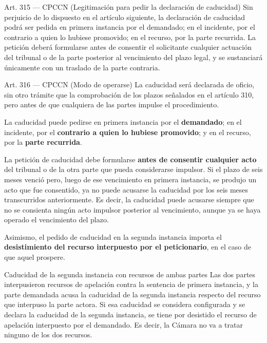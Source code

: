 \documentclass[12pt,oneside]{book}
\begin{document}
\begin{articulo}{Art. 315 --- CPCCN (Legitimación para pedir la declaración de caducidad)}
Sin perjuicio de lo dispuesto en el artículo siguiente, la declaración de caducidad podrá ser pedida en primera instancia por el demandado; en el incidente, por el contrario a quien lo hubiese promovido; en el recurso, por la parte recurrida. La petición deberá formularse antes de consentir el solicitante cualquier actuación del tribunal o de la parte posterior al vencimiento del plazo legal, y se sustanciará únicamente con un traslado de la parte contraria.
\end{articulo}

\begin{articulo}{Art. 316 --- CPCCN (Modo de operarse)}
La caducidad será declarada de oficio, sin otro trámite que la comprobación de los plazos señalados en el artículo 310, pero antes de que cualquiera de las partes impulse el procedimiento.
\end{articulo}

La caducidad puede pedirse en primera instancia por el \textbf{demandado}; en el incidente, por el \textbf{contrario a quien lo hubiese promovido}; y en el recurso, por la \textbf{parte recurrida}.

La petición de caducidad debe formularse \textbf{antes de consentir cualquier acto} del tribunal o de la otra parte que pueda considerarse impulsor. Si el plazo de seis meses venció pero, luego de ese vencimiento en primera instancia, se produjo un acto que fue consentido, ya no puede acusarse la caducidad por los seis meses transcurridos anteriormente. Es decir, la caducidad puede acusarse siempre que no se consienta ningún acto impulsor posterior al vencimiento, aunque ya se haya operado el vencimiento del plazo.

Asimismo, el pedido de caducidad en la segunda instancia importa el \textbf{desistimiento del recurso interpuesto por el peticionario}, en el caso de que aquel prospere.

\begin{example}{Caducidad de la segunda instancia con recursos de ambas partes}
Las dos partes interpusieron recursos de apelación contra la sentencia de primera instancia, y la parte demandada acusa la caducidad de la segunda instancia respecto del recurso que interpuso la parte actora. Si esa caducidad se considera configurada y se declara la caducidad de la segunda instancia, se tiene por desistido el recurso de apelación interpuesto por el demandado. Es decir, la Cámara no va a tratar ninguno de los dos recursos.
\end{example}
\end{document}
